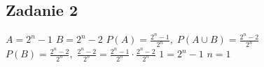 \subsection{Zadanie 2}

$A=2^n-1$\newline\newline
$B=2^n-2$\newline\newline
$P(A)=\frac{2^n-1}{2^n},\;P(A\cup{B})=\frac{2^n-2}{2^n}$\newline\newline
$P(B)=\frac{2^n-2}{2^n},\;\frac{2^n-2}{2^n}=\frac{2^n-1}{2^n}\cdot{\frac{2^n-2}{2^n}}$\newline\newline
$1=2^n-1$\newline\newline
$n=1$

